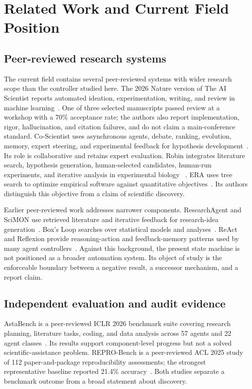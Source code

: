 \section{Related Work and Current Field Position}
\label{sec:related_work}

\subsection{Peer-reviewed research systems}

The current field contains several peer-reviewed systems with wider research
scope than the controller studied here. The 2026 Nature version of The AI
Scientist reports automated ideation, experimentation, writing, and review in
machine learning~\cite{lu2026aiscientist}. One of three selected manuscripts
passed review at a workshop with a 70\% acceptance rate; the authors also
report implementation, rigor, hallucination, and citation failures, and do
not claim a main-conference standard. Co-Scientist uses asynchronous agents,
debate, ranking, evolution, memory, expert steering, and experimental
feedback for hypothesis development~\cite{gottweis2026coscientist}. Its role
is collaborative and retains expert evaluation. Robin integrates literature
search, hypothesis generation, human-selected candidates, human-run
experiments, and iterative analysis in experimental biology
~\cite{ghareeb2026robin}. ERA uses tree search to optimize empirical software
against quantitative objectives~\cite{aygun2026era}. Its authors distinguish
this objective from a claim of scientific discovery.

Earlier peer-reviewed work addresses narrower components. ResearchAgent and
SciMON use retrieved literature and iterative feedback for research-idea
generation~\cite{baek2025researchagent,wang2024scimon}. Box's Loop searches
over statistical models and analyses~\cite{li2024boxlm}. ReAct and Reflexion
provide reasoning-action and feedback-memory patterns used by many agent
controllers~\cite{yao2023react,shinn2023reflexion}. Against this background,
the present state machine is not positioned as a broader automation system.
Its object of study is the enforceable boundary between a negative result, a
successor mechanism, and a report claim.

\subsection{Independent evaluation and audit evidence}

AstaBench is a peer-reviewed ICLR 2026 benchmark suite covering research
planning, literature tasks, coding, and data analysis across 57 agents and 22
agent classes~\cite{bragg2026astabench}. Its results support component-level
progress but not a solved scientific-assistance problem. REPRO-Bench is a
peer-reviewed ACL 2025 study of 112 paper-and-package reproducibility
assessments; the strongest representative baseline reported 21.4\%
accuracy~\cite{hu2025reprobench}. Both studies separate a benchmark outcome
from a broad statement about discovery.

